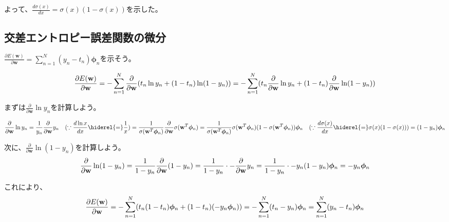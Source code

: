 よって、$\frac{d \sigma(x)}{dx}= \sigma(x)(1-\sigma(x))$を示した。

\subsection*{交差エントロピー誤差関数の微分}

$\frac{\partial E(\mathbf{w})}{\partial \mathbf{w}} = \sum_{n=1}^N (y_n - t_n) \bm{\phi}_n$を示そう。

\begin{dmath*}
\frac{\partial E(\mathbf{w})}{\partial \mathbf{w}} = -\sum_{n=1}^N \frac{\partial}{\partial \mathbf{w}}(  t_n \ln y_n + (1-t_n)\ln(1-y_n)  ) \\
= -\sum_{n=1}^N  (  t_n \frac{\partial}{\partial \mathbf{w}} \ln y_n + (1-t_n) 	\frac{\partial}{\partial \mathbf{w}} \ln (1 - y_n))
\end{dmath*}

まずは$\frac{\partial}{\partial \mathbf{w}} \ln y_n$を計算しよう。

\begin{dmath*}
\frac{\partial}{\partial \mathbf{w}} \ln y_n = \frac{1}{y_n} \frac{\partial}{\partial \mathbf{w}} y_n \quad (\because  \frac{d \ln x}{dx} \hiderel{=} \frac{1}{x}) \\
=  \frac{1}{ \sigma(\mathbf{w}^T \bm{\phi}_n)} 	\frac{\partial}{\partial \mathbf{w}} \sigma(\mathbf{w}^T \bm{\phi}_n) \\
= \frac{1}{ \sigma(\mathbf{w}^T \bm{\phi}_n)}  \sigma(\mathbf{w}^T \bm{\phi}_n)  (1 -  \sigma(\mathbf{w}^T \bm{\phi}_n)  ) 	\bm{\phi}_n \quad (\because \frac{d \sigma(x)}{dx} \hiderel{=} \sigma(x)(1-\sigma(x))) \\
= (1 - y_n) \bm{\phi}_n
\end{dmath*}

次に、$\frac{\partial}{\partial \mathbf{w}} \ln (1 - y_n)$を計算しよう。
\begin{dmath*}
\frac{\partial}{\partial \mathbf{w}} \ln (1 - y_n) = \frac{1}{1 - y_n} \frac{\partial}{\partial \mathbf{w}} (1 - y_n) \\
= \frac{1}{1 - y_n} \cdot - \frac{\partial}{\partial \mathbf{w}} y_n	\\
= \frac{1}{1 - y_n} \cdot - y_n (1 - y_n) \bm{\phi}_n \\
= - y_n \bm{\phi}_n 
\end{dmath*}

これにより、
\begin{dmath*}
\frac{\partial E(\mathbf{w})}{\partial \mathbf{w}} = -\sum_{n=1}^N  (  t_n  (1-t_n)\bm{\phi}_n   + (1-t_n)(-y_n \bm{\phi}_n))\\
= -\sum_{n=1}^N (t_n - y_n) \bm{\phi}_n \\
= \sum_{n=1}^N (y_n - t_n) \bm{\phi}_n
\end{dmath*}

